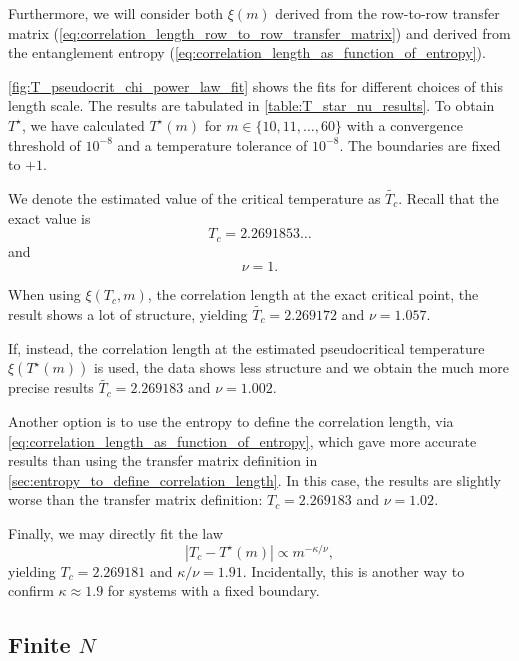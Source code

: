 Furthermore, we will consider both $\xi(m)$ derived from the row-to-row transfer matrix
(\autoref{eq:correlation_length_row_to_row_transfer_matrix}) and derived from the entanglement entropy
(\autoref{eq:correlation_length_as_function_of_entropy}).

\autoref{fig:T_pseudocrit_chi_power_law_fit} shows the fits for different choices of this length scale.
The results are tabulated in \autoref{table:T_star_nu_results}.
To obtain $T^{\star}$, we have calculated $T^{\star}(m)$ for $m \in \{10,
11, \dots, 60\}$ with a convergence threshold of $10^{-8}$ and a temperature tolerance of $10^{-8}$.
The boundaries are fixed to $+1$.

We denote the estimated value of the critical temperature as $\widetilde{T_c}$. Recall that the exact value is
\begin{equation}
  T_c = 2.2691853\dots
\end{equation}
and
\begin{equation}
  \nu = 1.
\end{equation}

When using $\xi(T_c, m)$, the correlation length at the exact critical point,
the result shows a lot of structure, yielding $\widetilde{T_c} = 2.269172$ and $\nu = 1.057$.

If, instead, the correlation length at the estimated pseudocritical temperature $\xi(T^{\star}(m))$ is used,
the data shows less structure and we obtain the much more precise results $\widetilde{T_c} = 2.269183$ and $\nu =
1.002$.

Another option is to use the entropy to define the correlation length,
via \autoref{eq:correlation_length_as_function_of_entropy}, which gave more accurate results than using the transfer
matrix definition in \autoref{sec:entropy_to_define_correlation_length}.
In this case, the results are slightly worse than the transfer matrix definition:
$T_c = 2.269183$ and $\nu = 1.02$.

Finally, we may directly fit the law
\begin{equation}
  |T_c - T^{\star}(m)| \propto m^{-\kappa/\nu},
\end{equation}
yielding $T_c = 2.269181$ and $\kappa/\nu = 1.91$.
Incidentally, this is another way to confirm $\kappa \approx 1.9$ for systems with a fixed boundary.

\subsection{Finite $N$}

